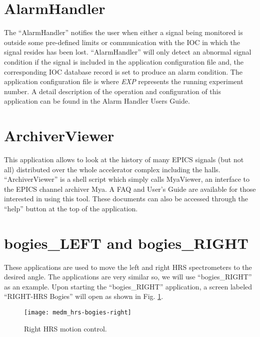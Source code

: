 {{\section{AlarmHandler}
The ``AlarmHandler'' notifies the user when either a signal being monitored
is outside some pre-defined limits or
communication with the IOC in which the signal resides has been lost.
``AlarmHandler'' will only detect an abnormal signal condition if
the signal is included in the application configuration file
and, the corresponding IOC database record is set to produce an alarm condition.
The application configuration file is 
where {\it EXP} represents the running experiment number.
A detail description of the operation and configuration of this application can be found
in the Alarm Handler Users
Guide.

\section{ArchiverViewer}
This application allows to look at the history of many EPICS signals (but not all) distributed over the whole accelerator complex including
the halls. ``ArchiverViewer'' is a shell script which simply calls MyaViewer, an interface to the EPICS channel archiver Mya.
A FAQ and User's Guide are available
for those interested in using this tool. These documents can also be accessed through the ``help'' button at the top of the application.

\section{bogies\_LEFT and bogies\_RIGHT}
These applications are used to move the left and right HRS spectrometers to the desired angle.
The applications are very similar so, we will
use ``bogies\_RIGHT'' as an example.
Upon starting the ``bogies\_RIGHT'' application, 
a screen labeled ``RIGHT-HRS Bogies'' will open as 
shown in Fig. \ref{fig:medm-hrs-bogies}.
\begin{figure}[htb]
\begin{center}
    \texttt{[image: medm\_hrs-bogies-right]}
\caption[Right HRS Motion Control]{Right HRS motion control.}
\label{fig:medm-hrs-bogies}
\end{center}
\end{figure}

}}
